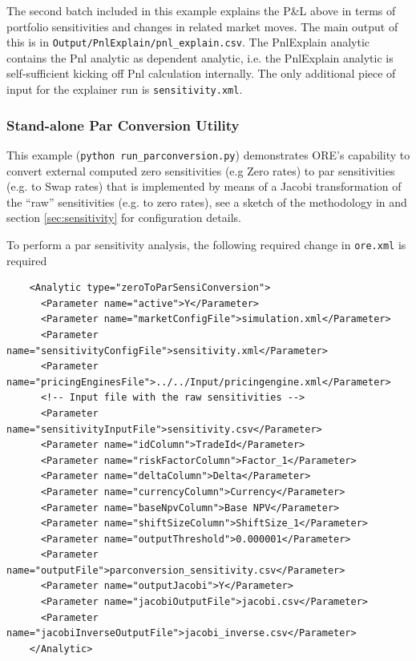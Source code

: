 The second batch included in this example explains the
P\&L above in terms of portfolio sensitivities and changes in related market moves. The main output of this
is in {\tt Output/PnlExplain/pnl\_explain.csv}. The PnlExplain analytic contains the Pnl analytic as dependent
analytic, i.e. the PnlExplain analytic is self-sufficient kicking off Pnl calculation internally.
The only additional piece of input for the explainer run is {\tt sensitivity.xml}.

\subsubsection{Stand-alone Par Conversion Utility}
\label{example:marketrisk_parconversionl}

This example ({\tt python run\_parconversion.py}) demonstrates ORE's capability to convert external computed zero sensitivities (e.g Zero rates) to par sensitivities (e.g. to Swap rates)
that is implemented  by means of a Jacobi transformation of the ``raw'' sensitivities (e.g. to zero rates), see a sketch of the
methodology in \cite{methods} and section \ref{sec:sensitivity} for configuration details.

To perform a par sensitivity analysis, the following required change in {\tt ore.xml} is required

\begin{verbatim}
    <Analytic type="zeroToParSensiConversion">
      <Parameter name="active">Y</Parameter>
      <Parameter name="marketConfigFile">simulation.xml</Parameter>
      <Parameter name="sensitivityConfigFile">sensitivity.xml</Parameter>
      <Parameter name="pricingEnginesFile">../../Input/pricingengine.xml</Parameter>
	  <!-- Input file with the raw sensitivities -->
      <Parameter name="sensitivityInputFile">sensitivity.csv</Parameter>
      <Parameter name="idColumn">TradeId</Parameter>
      <Parameter name="riskFactorColumn">Factor_1</Parameter>
      <Parameter name="deltaColumn">Delta</Parameter>
	  <Parameter name="currencyColumn">Currency</Parameter>
	  <Parameter name="baseNpvColumn">Base NPV</Parameter>
 	  <Parameter name="shiftSizeColumn">ShiftSize_1</Parameter>
      <Parameter name="outputThreshold">0.000001</Parameter>
      <Parameter name="outputFile">parconversion_sensitivity.csv</Parameter>
      <Parameter name="outputJacobi">Y</Parameter>
      <Parameter name="jacobiOutputFile">jacobi.csv</Parameter>
      <Parameter name="jacobiInverseOutputFile">jacobi_inverse.csv</Parameter>
    </Analytic>
\end{verbatim}


